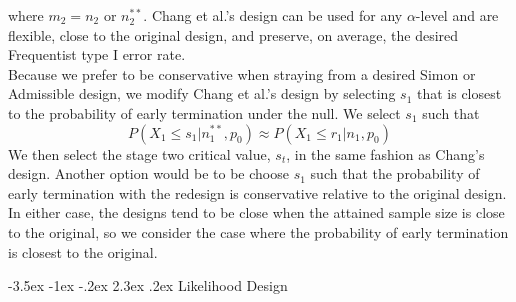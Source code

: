 \documentclass[12pt]{report}\usepackage[]{graphicx}\usepackage[]{color}
\makeatletter
\newlength{\li}\setlength{\li}{14.48pt}
\newlength{\di}\setlength{\di}{-3.5mm}
\renewcommand\section{ \@startsection {section}{1}{\z@}%
                                   {-3.5ex \@plus -1ex \@minus -.2ex}%
                                   {2.3ex \@plus.2ex}%
                                   {\centering\large\fontfamily{qcs}\selectfont}}
\makeatother
\begin{document}
where $m_2 = n_2$ or $n_2^{\ast\ast}$. 
Chang et al.'s design can be used for any $\alpha$-level and are flexible, close to the original design, and preserve, on average, the desired Frequentist type I error rate. \\
Because we prefer to be conservative when straying from a desired Simon or Admissible design, we modify Chang et al.'s design by selecting $s_1$ that is closest to the probability of early termination under the null. We select $s_1$ such that $$P(X_1 \leq s_1 | n_1^{\ast\ast}, p_0) \approx P(X_1 \leq r_1 | n_1, p_0)$$ We then select the stage two critical value, $s_t$, in the same fashion as Chang's design. Another option would be to be choose $s_1$ such that the probability of early termination with the redesign is conservative relative to the original design. In either case, the designs tend to be close when the attained sample size is close to the original, so we consider the case where the probability of early termination is closest to the original.   

\section{Likelihood Design}
\end{document}
